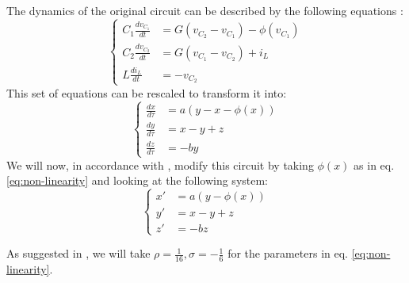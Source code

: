 The dynamics of the original circuit can be described by the following
equations \cite[eq. (1.1)]{Matsumoto85}:
\begin{equation}
  \label{eq:dynamics}
  \left\{
    \begin{aligned}
      C_1\frac{dv_{C_1}}{dt} &= G(v_{C_2}-v_{C_1})-\phi(v_{C_1})\\
      C_2\frac{dv_{C_2}}{dt} &= G(v_{C_1}-v_{C_2}) + i_L\\
      L \frac{di_L}{dt} &= -v_{C_2}
    \end{aligned}
  \right.
\end{equation}
This set of equations can be rescaled to transform it into:
\begin{equation}
  \label{eq:rescaling}
  \left\{
    \begin{aligned}
      \frac{dx}{d\tau} &= a(y-x-\phi(x))\\
      \frac{dy}{d\tau} &= x - y + z\\
      \frac{dz}{d\tau} &= -b y
    \end{aligned}
  \right.
\end{equation}
We will now, in accordance with \cite{hirsch12}, modify this circuit
by taking $\phi(x)$ as in eq. \ref{eq:non-linearity} and looking at the
following system:
\begin{equation}
  \label{eq:modified-system}
  \left\{
    \begin{aligned}
      x' &= a(y-\phi(x))\\
      y' &= x-y+z\\
      z' &= -bz
    \end{aligned}
  \right.
\end{equation}

As suggested in \cite{hirsch12}, we will take $\rho=\frac{1}{16},
\sigma=-\frac{1}{6}$ for the parameters in eq.
\ref{eq:non-linearity}.

